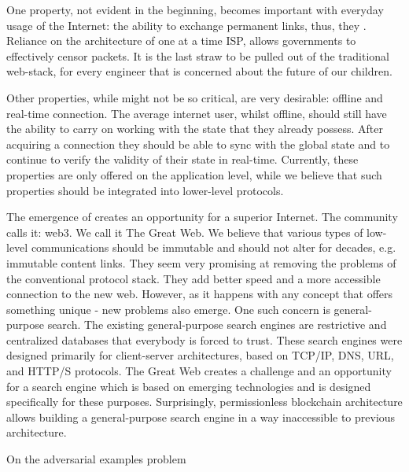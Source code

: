\documentclass[8pt,oneside]{amsart}
\makeatletter
\newcommand{\linkgreen}[2]{\href{#1}{\color{green}{#2}}}
\renewcommand\subsection{\@startsection{subsection}
                                    {2}{\z@}
                                    {-3.25ex\@plus -1ex \@minus -.2ex}
                                    {0ex \@plus .2ex}
                                    {\play\Large}
                        }
\newcommand{\titleSection}[1]{\subsection{#1}}
\makeatother
\begin{document}
One property, not evident in the beginning, becomes important with everyday usage of the Internet: the ability to exchange permanent links, thus, they \linkgreen{https://ipfs.io/ipfs/QmNhaUrhM7KcWzFYdBeyskoNyihrpHvUEBQnaddwPZigcN}{would not break after time had passed}. Reliance on the architecture of one at a time ISP, allows governments to effectively censor packets. It is the last straw to be pulled out of the traditional web-stack, for every engineer that is concerned about the future of our children.

Other properties, while might not be so critical, are very desirable: offline and real-time connection. The average internet user, whilst offline, should still have the ability to carry on working with the state that they already possess. After acquiring a connection they should be able to sync with the global state and to continue to verify the validity of their state in real-time. Currently, these properties are only offered on the application level, while we believe that such properties should be integrated into lower-level protocols.

The emergence of \linkgreen{https://ipfs.io/ipfs/Qmf3eHU9idMUZgx6MKhCsFPWL24X9pDUi2ECqyH8UtBAMQ}{a brand-new web-stack} creates an opportunity for a superior Internet. The community calls it: web3. We call it The Great Web. We believe that various types of low-level communications should be immutable and should not alter for decades, e.g. immutable content links. They seem very promising at removing the problems of the conventional protocol stack. They add better speed and a more accessible connection to the new web. However, as it happens with any concept that offers something unique - new problems also emerge. One such concern is general-purpose search. The existing general-purpose search engines are restrictive and centralized databases that everybody is forced to trust. These search engines were designed primarily for client-server architectures, based on TCP/IP, DNS, URL, and HTTP/S protocols. The Great Web creates a challenge and an opportunity for a search engine which is based on emerging technologies and is designed specifically for these purposes. Surprisingly, permissionless blockchain architecture allows building a general-purpose search engine in a way inaccessible to previous architecture.

\titleSection{On the adversarial examples problem}\label{adversarial-examples}
\end{document}
